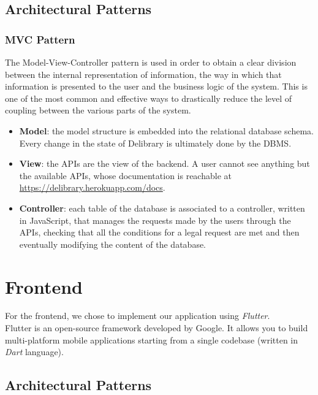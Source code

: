 \subsection{Architectural Patterns}

\subsubsection{MVC Pattern}
The Model-View-Controller pattern is used in order to obtain a clear division between the internal representation of information, the way in which that information is presented to the user and the business logic of the system.
This is one of the most common and effective ways to drastically reduce the level of coupling between the various parts of the system.

\begin{itemize}
      \item \textbf{Model}:
            the model structure is embedded into the relational database schema.
            Every change in the state of Delibrary is ultimately done by the DBMS.
      \item \textbf{View}:
            the APIs are the view of the backend. A user cannot see anything but the available APIs, whose documentation is reachable at \href{https://delibrary.herokuapp.com/docs/}{https://delibrary.herokuapp.com/docs}.
      \item \textbf{Controller}:
            each table of the database is associated to a controller, written in JavaScript, that manages the requests made by the users through the APIs, checking that all the conditions for a legal request are met and then eventually modifying the content of the database.
\end{itemize}


\section{Frontend}
For the frontend, we chose to implement our application using \emph{Flutter}.\\
Flutter is an open-source framework developed by Google.
It allows you to build multi-platform mobile applications starting from a single codebase (written in \emph{Dart} language).

\subsection{Architectural Patterns}

